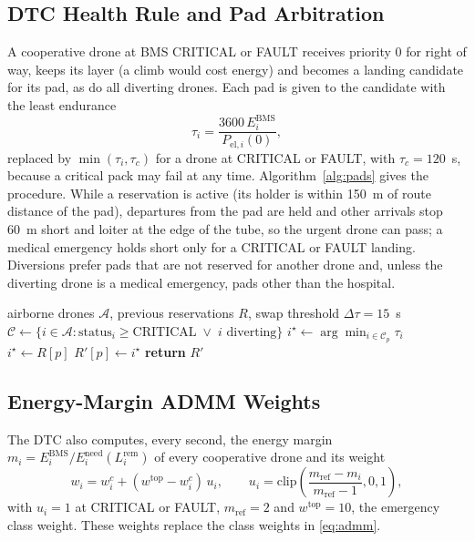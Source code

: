 \documentclass[journal]{IEEEtran}
\newcommand{\Ebms}{E^{\mathrm{BMS}}}
\newcommand{\Eneed}{E^{\mathrm{need}}}
\begin{document}
\subsection{DTC Health Rule and Pad Arbitration}
A cooperative drone at BMS CRITICAL or FAULT receives priority 0 for right of way, keeps its layer (a climb would cost energy) and becomes a landing candidate for its pad, as do all diverting drones. Each pad is given to the candidate with the least endurance
\begin{equation}
\tau_i = \frac{3600\,\Ebms_i}{P_{\mathrm{el},i}(0)},
\end{equation}
replaced by $\min(\tau_i, \tau_c)$ for a drone at CRITICAL or FAULT, with $\tau_c = 120$~s, because a critical pack may fail at any time. Algorithm~\ref{alg:pads} gives the procedure. While a reservation is active (its holder is within 150~m of route distance of the pad), departures from the pad are held and other arrivals stop 60~m short and loiter at the edge of the tube, so the urgent drone can pass; a medical emergency holds short only for a CRITICAL or FAULT landing. Diversions prefer pads that are not reserved for another drone and, unless the diverting drone is a medical emergency, pads other than the hospital.

\begin{algorithm}[t]
\caption{Endurance-ordered pad arbitration (every 1 s)}
\label{alg:pads}
\begin{algorithmic}[1]
\REQUIRE airborne drones $\mathcal{A}$, previous reservations $R$, swap threshold $\Delta\tau = 15$~s
\STATE $\mathcal{C} \leftarrow \{ i \in \mathcal{A} : \text{status}_i \ge \text{CRITICAL} \;\lor\; i \text{ diverting} \}$
  \STATE $i^\star \leftarrow \arg\min_{i \in \mathcal{C}_p} \tau_i$
    \STATE $i^\star \leftarrow R[p]$ 
  \ENDIF
  \STATE $R'[p] \leftarrow i^\star$
\ENDFOR
\STATE \textbf{return} $R'$ 
\end{algorithmic}
\end{algorithm}

\subsection{Energy-Margin ADMM Weights}
The DTC also computes, every second, the energy margin $m_i = \Ebms_i / \Eneed_i(L^{\mathrm{rem}}_i)$ of every cooperative drone and its weight
\begin{equation}
w_i = w^{c}_i + (w^{\mathrm{top}} - w^{c}_i)\, u_i,\qquad u_i = \mathrm{clip}\!\left(\frac{m_{\mathrm{ref}} - m_i}{m_{\mathrm{ref}} - 1}, 0, 1\right),
\label{eq:weight}
\end{equation}
with $u_i = 1$ at CRITICAL or FAULT, $m_{\mathrm{ref}} = 2$ and $w^{\mathrm{top}} = 10$, the emergency class weight. These weights replace the class weights in \eqref{eq:admm}.
\end{document}
